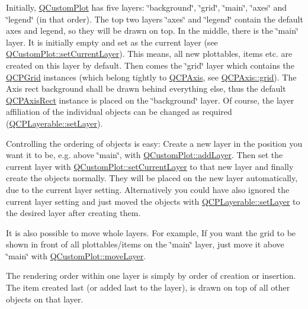Initially, \hyperlink{classQCustomPlot}{Q\+Custom\+Plot} has five layers\+: \char`\"{}background\char`\"{}, \char`\"{}grid\char`\"{}, \char`\"{}main\char`\"{}, \char`\"{}axes\char`\"{} and \char`\"{}legend\char`\"{} (in that order). The top two layers \char`\"{}axes\char`\"{} and \char`\"{}legend\char`\"{} contain the default axes and legend, so they will be drawn on top. In the middle, there is the \char`\"{}main\char`\"{} layer. It is initially empty and set as the current layer (see \hyperlink{classQCustomPlot_a73a6dc47c653bb6f8f030abca5a11852}{Q\+Custom\+Plot\+::set\+Current\+Layer}). This means, all new plottables, items etc. are created on this layer by default. Then comes the \char`\"{}grid\char`\"{} layer which contains the \hyperlink{classQCPGrid}{Q\+C\+P\+Grid} instances (which belong tightly to \hyperlink{classQCPAxis}{Q\+C\+P\+Axis}, see \hyperlink{classQCPAxis_ac4fb913cce3072b5e75a4635e0f6cd04}{Q\+C\+P\+Axis\+::grid}). The Axis rect background shall be drawn behind everything else, thus the default \hyperlink{classQCPAxisRect}{Q\+C\+P\+Axis\+Rect} instance is placed on the \char`\"{}background\char`\"{} layer. Of course, the layer affiliation of the individual objects can be changed as required (\hyperlink{classQCPLayerable_ab0d0da6d2de45a118886d2c8e16d5a54}{Q\+C\+P\+Layerable\+::set\+Layer}).

Controlling the ordering of objects is easy\+: Create a new layer in the position you want it to be, e.\+g. above \char`\"{}main\char`\"{}, with \hyperlink{classQCustomPlot_ad5255393df078448bb6ac83fa5db5f52}{Q\+Custom\+Plot\+::add\+Layer}. Then set the current layer with \hyperlink{classQCustomPlot_a73a6dc47c653bb6f8f030abca5a11852}{Q\+Custom\+Plot\+::set\+Current\+Layer} to that new layer and finally create the objects normally. They will be placed on the new layer automatically, due to the current layer setting. Alternatively you could have also ignored the current layer setting and just moved the objects with \hyperlink{classQCPLayerable_ab0d0da6d2de45a118886d2c8e16d5a54}{Q\+C\+P\+Layerable\+::set\+Layer} to the desired layer after creating them.

It is also possible to move whole layers. For example, If you want the grid to be shown in front of all plottables/items on the \char`\"{}main\char`\"{} layer, just move it above \char`\"{}main\char`\"{} with \hyperlink{classQCustomPlot_ae896140beff19424e9e9e02d6e331104}{Q\+Custom\+Plot\+::move\+Layer}.

The rendering order within one layer is simply by order of creation or insertion. The item created last (or added last to the layer), is drawn on top of all other objects on that layer.

